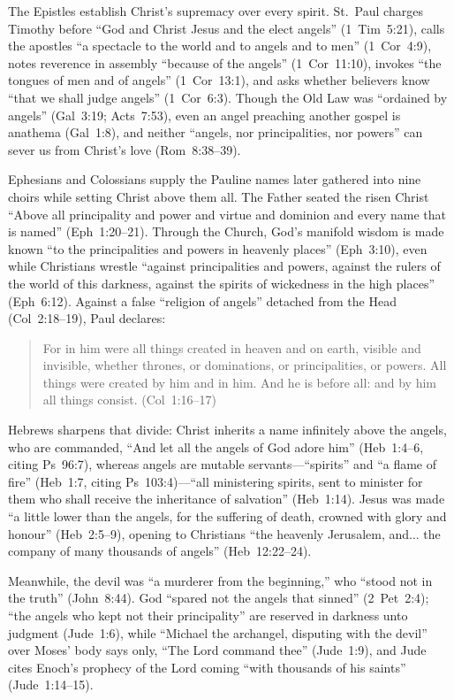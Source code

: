 The Epistles establish Christ's supremacy over every spirit. St.~Paul charges Timothy before ``God and Christ Jesus and the elect angels'' (1~Tim~5:21), calls the apostles ``a spectacle to the world and to angels and to men'' (1~Cor~4:9), notes reverence in assembly ``because of the angels'' (1~Cor~11:10), invokes ``the tongues of men and of angels'' (1~Cor~13:1), and asks whether believers know ``that we shall judge angels'' (1~Cor~6:3). Though the Old Law was ``ordained by angels'' (Gal~3:19; Acts~7:53), even an angel preaching another gospel is anathema (Gal~1:8), and neither ``angels, nor principalities, nor powers'' can sever us from Christ's love (Rom~8:38--39).

Ephesians and Colossians supply the Pauline names later gathered into nine choirs while setting Christ above them all. The Father seated the risen Christ ``Above all principality and power and virtue and dominion and every name that is named'' (Eph~1:20--21). Through the Church, God's manifold wisdom is made known ``to the principalities and powers in heavenly places'' (Eph~3:10), even while Christians wrestle ``against principalities and powers, against the rulers of the world of this darkness, against the spirits of wickedness in the high places'' (Eph~6:12). Against a false ``religion of angels'' detached from the Head (Col~2:18--19), Paul declares:
\begin{quotation}
For in him were all things created in heaven and on earth, visible and invisible, whether thrones, or dominations, or principalities, or powers. All things were created by him and in him. And he is before all: and by him all things consist. (Col~1:16--17)
\end{quotation}
Hebrews sharpens that divide: Christ inherits a name infinitely above the angels, who are commanded, ``And let all the angels of God adore him'' (Heb~1:4--6, citing Ps~96:7), whereas angels are mutable servants---``spirits'' and ``a flame of fire'' (Heb~1:7, citing Ps~103:4)---``all ministering spirits, sent to minister for them who shall receive the inheritance of salvation'' (Heb~1:14). Jesus was made ``a little lower than the angels, for the suffering of death, crowned with glory and honour'' (Heb~2:5--9), opening to Christians ``the heavenly Jerusalem, and... the company of many thousands of angels'' (Heb~12:22--24).

Meanwhile, the devil was ``a murderer from the beginning,'' who ``stood not in the truth'' (John~8:44). God ``spared not the angels that sinned'' (2~Pet~2:4); ``the angels who kept not their principality'' are reserved in darkness unto judgment (Jude~1:6), while ``Michael the archangel, disputing with the devil'' over Moses' body says only, ``The Lord command thee'' (Jude~1:9), and Jude cites Enoch's prophecy of the Lord coming ``with thousands of his saints'' (Jude~1:14--15).

